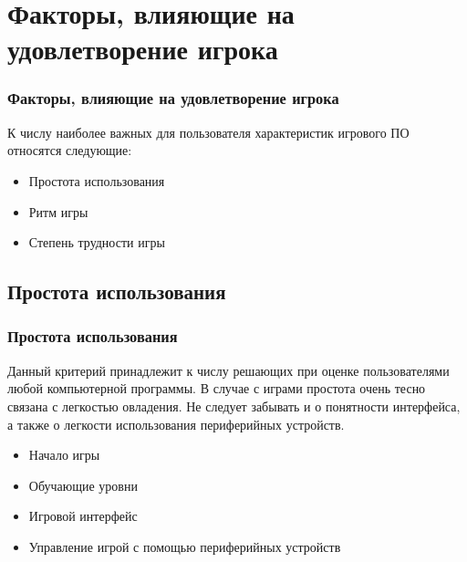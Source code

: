 \documentclass[10pt]{beamer}
\begin{document}
\section{Факторы, влияющие на удовлетворение игрока}
\begin{frame}
\frametitle{Факторы, влияющие на удовлетворение игрока}

\begin{block}{}
  К числу наиболее важных для пользователя характеристик игрового ПО относятся следующие:
  \begin{itemize}
    \item Простота использования
    \item Ритм игры
    \item Степень трудности игры
  \end{itemize}
\end{block}
\end{frame}

\subsection{Простота использования}
\begin{frame}
\frametitle{Простота использования}

\begin{block}{}
  Данный критерий принадлежит к числу решающих при оценке пользователями любой компьютерной программы. В случае с играми простота очень тесно связана с легкостью овладения. Не следует забывать и о понятности интерфейса, а также о легкости использования периферийных устройств.
  \begin{itemize}
    \item Начало игры
    \item Обучающие уровни
    \item Игровой интерфейс
    \item Управление игрой с помощью периферийных устройств
  \end{itemize}
\end{block}

\end{frame}
\end{document}
